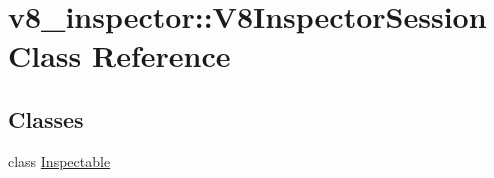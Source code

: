 \hypertarget{classv8__inspector_1_1V8InspectorSession}{}\section{v8\+\_\+inspector\+:\+:V8\+Inspector\+Session Class Reference}
\label{classv8__inspector_1_1V8InspectorSession}
\subsection*{Classes}
\begin{DoxyCompactItemize}
\item 
class \mbox{\hyperlink{classv8__inspector_1_1V8InspectorSession_1_1Inspectable}{Inspectable}}
\end{DoxyCompactItemize}
